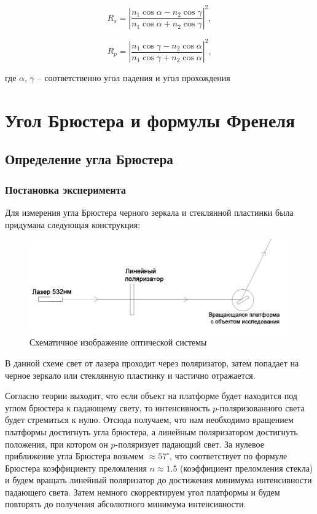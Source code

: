 \documentclass[a4paper,14pt]{extarticle}
\begin{document}
			\begin{equation}
			R_s = \left|\frac{n_1 \cos{\alpha} - n_2 \cos{\gamma}}{n_1 \cos{\alpha} + n_2 \cos{\gamma}} \right|^2,
			\end{equation}
			
			\begin{equation}
			R_p = \left| \frac{n_1 \cos{\gamma} - n_2 \cos{\alpha}}{n_1 \cos{\gamma} + n_2 \cos{\alpha}}\right|^2,
			\end{equation}
			
			где $\alpha$, $\gamma$ – соответственно угол падения и угол прохождения
	\section{Угол Брюстера и формулы Френеля}
		\subsection{Определение угла Брюстера}
			\subsubsection{Постановка эксперимента}
				Для измерения угла Брюстера черного зеркала и стеклянной пластинки была придумана следующая конструкция:
				\begin{figure}[h!]
					\centering
					\includegraphics[width=1\linewidth]{Bruster3.png}
					\caption{Схематичное изображение оптической системы }
					\label{fig1}
				\end{figure}
				
				В данной схеме свет от лазера проходит через поляризатор, затем попадает на черное зеркало или стеклянную пластинку и частично отражается. 
				
				Согласно теории выходит, что если объект на платформе будет находится под углом брюстера к падающему свету, то интенсивность $p$-поляризованного света будет стремиться к нулю. Отсюда получаем, что нам необходимо вращением платформы достигнуть угла брюстера, а линейным поляризатором достигнуть положения, при котором он $p$-поляризует падающий свет. За нулевое приближение угла Брюстера возьмем $\approx 57^\circ$, что соответствует по формуле Брюстера коэффициенту преломления $n\approx 1.5$ (коэффициент преломления стекла) и будем вращать линейный поляризатор до достижения минимума интенсивности падающего света. Затем немного скорректируем угол платформы и будем повторять до получения абсолютного минимума интенсивности.
\end{document}
